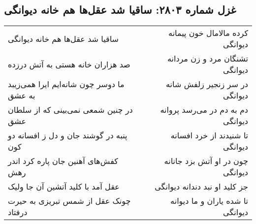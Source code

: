 \begin{center}
\section*{غزل شماره ۲۸۰۳: ساقیا شد عقل‌ها هم خانه دیوانگی}
\label{sec:2803}
\begin{longtable}{l p{0.5cm} r}
ساقیا شد عقل‌ها هم خانه دیوانگی
&&
کرده مالامال خون پیمانه دیوانگی
\\
صد هزاران خانه هستی به آتش درزده
&&
تشنگان مرد و زن مردانه دیوانگی
\\
ما دوسر چون شانه‌ایم ایرا همی‌زیبد به عشق
&&
در سر زنجیر زلفش شانه دیوانگی
\\
در چنین شمعی نمی‌بینی که از سلطان عشق
&&
دم به دم در می‌رسد پروانه دیوانگی
\\
پنبه در گوشند جان و دل ز افسانه دو کون
&&
تا شنیدند از خرد افسانه دیوانگی
\\
کفش‌های آهنین جان پاره کرد اندر رهش
&&
چون در او آتش بزد جانانه دیوانگی
\\
عقل آمد با کلید آتشین آن جا ولیک
&&
جز کلید او نبد دندانه دیوانگی
\\
چونک عقل از شمس تبریزی به حیرت درفتاد
&&
تا شده یاران و ما دیوانه دیوانگی
\\
\end{longtable}
\end{center}
